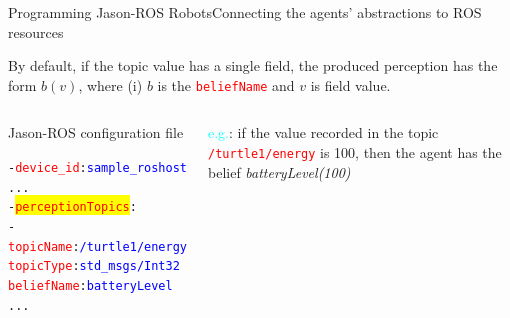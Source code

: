 \documentclass[compress]{beamer}
\newcommand{\yamlkey}[1]{\textcolor{red}{\texttt{#1}}}
\newcommand{\yamlvalue}[1]{\textcolor{blue}{\texttt{#1}}}
\begin{document}
\begin{frame}[fragile]{Programming Jason-ROS Robots}{Connecting the agents' abstractions to ROS resources}


\footnotesize
By default, if the topic value has a single field, the produced perception has the form $b(v)$, where (i) $b$ is the \yamlkey{beliefName} and $v$ is field value.

\vspace{.5cm}

\begin{columns}
 
\begin{block}{{\scriptsize Jason-ROS configuration file}}
\scriptsize
  \begin{alltt}
- \yamlkey{device_id}: \yamlvalue{sample_roshost}    
     ...
  - \colorbox{yellow}{\yamlkey{perceptionTopics}}:     
    - \yamlkey{topicName}: \yamlvalue{/turtle1/energy}
      \yamlkey{topicType}: \yamlvalue{std_msgs/Int32}
      \yamlkey{beliefName}: \yamlvalue{batteryLevel} 
     ...
  \end{alltt}
\end{block}  

 \scriptsize
 \textcolor{cyan}{e.g.}: if the value recorded in the topic \yamlkey{/turtle1/energy} is 100, then the agent has the belief \textit{batteryLevel(100)}

 
 
 
\end{columns}



\end{frame}
\end{document}
